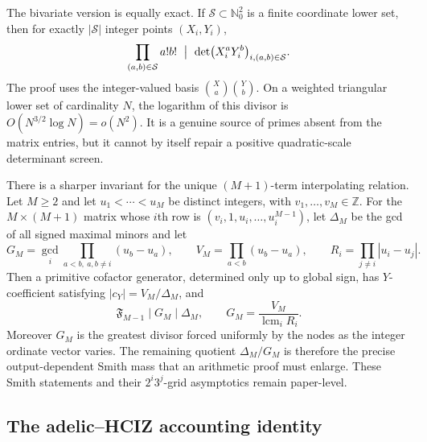 \documentclass[11pt,oneside]{article}
\theoremstyle{definition}
\theoremstyle{remark}
\newcommand{\Nzero}{\mathbb N_0}
\newcommand{\Z}{\mathbb Z}
\begin{document}
The bivariate version is equally exact.  If $\mathcal S\subset\Nzero^2$ is a finite coordinate
lower set, then for exactly $|\mathcal S|$ integer points $(X_i,Y_i)$,
\begin{equation}
 \prod_{(a,b)\in\mathcal S}a!b!
 \ \bigm|\
 \det\bigl(X_i^aY_i^b\bigr)_{i,(a,b)\in\mathcal S}.
 \label{fc:eq-lower-set-factorial}
\end{equation}
The proof uses the integer-valued basis $\binom{X}{a}\binom{Y}{b}$.  On a weighted triangular lower
set of cardinality $N$, the logarithm of this divisor is
$O(N^{3/2}\log N)=o(N^2)$.  It is a genuine source of primes absent from the matrix entries,
but it cannot by itself repair a positive quadratic-scale determinant screen.

There is a sharper invariant for the unique $(M+1)$-term interpolating relation.  Let $M\ge2$
and let $u_1<\cdots<u_M$ be distinct integers, with $v_1,\ldots,v_M\in\Z$.  For the
$M\times(M+1)$ matrix whose $i$th row
is $(v_i,1,u_i,\ldots,u_i^{M-1})$, let $\Delta_M$ be the gcd of all signed maximal minors and
let
\[
 G_M=\gcd_i\prod_{a<b,\ a,b\ne i}(u_b-u_a),\qquad
 V_M=\prod_{a<b}(u_b-u_a),\qquad
 R_i=\prod_{j\ne i}|u_i-u_j|.
\]
Then a primitive cofactor generator, determined only up to global sign, has
$Y$-coefficient satisfying $|c_Y|=V_M/\Delta_M$, and
\begin{equation}
 \mathfrak F_{M-1}\mid G_M\mid\Delta_M,
 \qquad
 G_M=\frac{V_M}{\operatorname{lcm}_i R_i}.
 \label{fc:eq-smith-node-divisor}
\end{equation}
Moreover $G_M$ is the greatest divisor forced uniformly by the nodes as the integer ordinate
vector varies.  The remaining quotient $\Delta_M/G_M$ is therefore the precise
output-dependent Smith mass that an arithmetic proof must enlarge.  These Smith statements
and their $2^i3^j$-grid asymptotics remain paper-level.

\subsection{The adelic--HCIZ accounting identity}
\label{fc:adelic-hciz}
\end{document}
